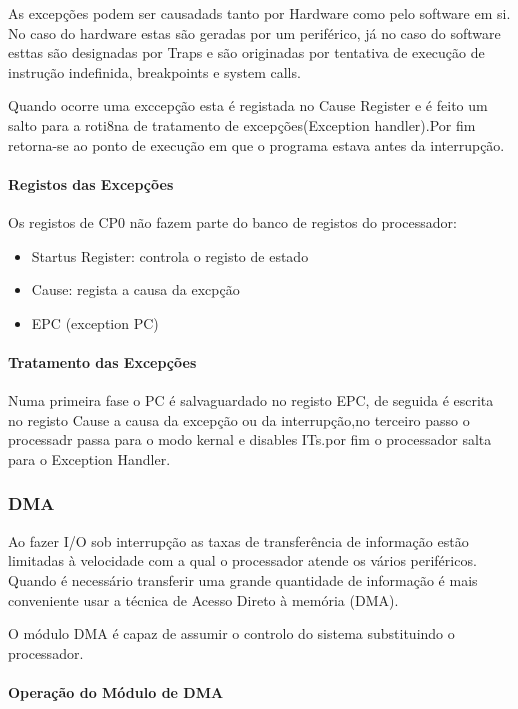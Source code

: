 \documentclass[10pt,a4paper]{paper}
\begin{document}
As excepções podem ser causadads tanto por Hardware como pelo software em si. No caso do hardware estas são geradas por um periférico, já no caso do software esttas são designadas por Traps e são originadas por tentativa de execução de instrução indefinida, breakpoints e system calls.

Quando ocorre uma exccepção esta é registada no Cause Register e é feito um salto para a roti8na de tratamento de excepções(Exception handler).Por fim retorna-se ao ponto de execução em que o programa estava antes da interrupção.

	\paragraph{Registos das Excepções}
	
		Os registos de CP0 não fazem parte do banco de registos do processador:
		\begin{itemize}
			\item Startus Register: controla o registo de estado
			\item Cause: regista a causa da excpção
			\item EPC (exception PC)
		\end{itemize}


	\paragraph*{Tratamento das Excepções}
	
	Numa primeira fase o PC é salvaguardado no registo EPC, de seguida é escrita no registo Cause a causa da excepção ou da interrupção,no terceiro passo o processadr passa para o modo kernal e disables ITs.por fim o processador salta para o Exception Handler.
	
	\subsubsection*{DMA}
	
	Ao fazer I/O sob interrupção as taxas de transferência de informação estão limitadas à velocidade com a qual o processador atende os vários periféricos.
	Quando é necessário transferir uma grande quantidade de informação é mais conveniente usar a técnica de Acesso Direto à memória (DMA).
	
	O módulo DMA é capaz de assumir o controlo do sistema substituindo o processador.
	
	\paragraph{Operação do Módulo de DMA}
	
\end{document}
